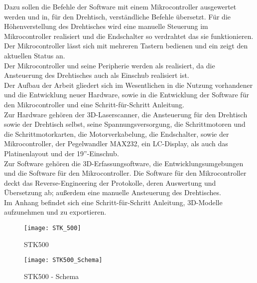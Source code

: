
Dazu sollen die Befehle der Software mit einem Mikrocontroller ausgewertet werden und in, für den Drehtisch, verständliche Befehle übersetzt.
Für die Höhenverstellung des Drehtisches wird eine manuelle Steuerung im Mikrocontroller realisiert und die Endschalter so verdrahtet das sie funktionieren. \\
Der Mikrocontroller lässt sich mit mehreren Tastern bedienen und ein  zeigt den aktuellen Status an.\\
Der Mikrocontroller und seine Peripherie werden als  realisiert, da die Ansteuerung des Drehtisches auch als Einschub realisiert ist.\\

Der Aufbau der Arbeit gliedert sich im Wesentlichen in die Nutzung vorhandener und die Entwicklung neuer Hardware, sowie in die Entwicklung der Software für den Mikrocontroller und eine Schritt-für-Schritt Anleitung. \\
Zur Hardware gehören der 3D-Laserscanner, die Ansteuerung für den Drehtisch sowie der Drehtisch selbst, seine Spannungsversorgung, die Schrittmotoren und die Schrittmotorkarten, die Motorverkabelung, die Endschalter, sowie der Mikrocontroller, der Pegelwandler MAX232, ein LC-Display, als auch das Platinenlayout und der 19''-Einschub.\\
Zur Software gehören die 3D-Erfassungsoftware, die Entwicklungsumgebungen und die Software für den Mikrocontroller. Die Software für den Mikrocontroller deckt das Reverse-Engineering der Protokolle, deren Auswertung und Übersetzung ab; außerdem eine manuelle Ansteuerung des Drehtisches.\\
Im Anhang befindet sich eine Schritt-für-Schritt Anleitung, 3D-Modelle aufzunehmen und zu exportieren.


\begin{figure}[htb]
\centering
\texttt{[image: STK\_500]}
\caption{STK500}
\label{fig:STK500}
\end{figure}
\begin{figure}[htb]
\centering
\texttt{[image: STK500\_Schema]}
\caption{STK500 - Schema}
\label{fig:STK500_Schema}
\end{figure}